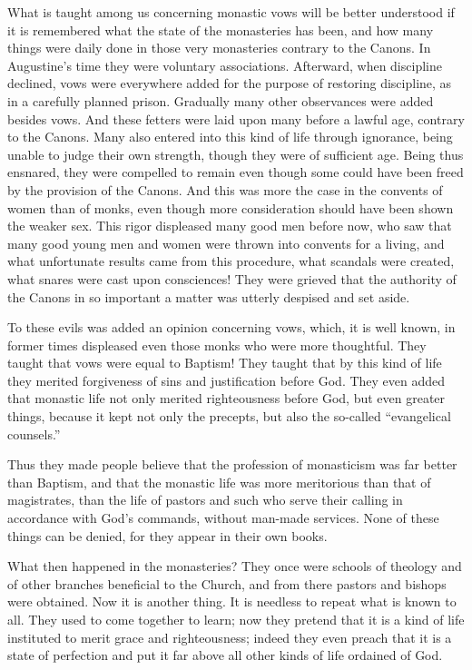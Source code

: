 What is taught among us concerning monastic vows will be better understood if it is remembered what the state of the monasteries has been, and how many things were daily done in those very monasteries contrary to the Canons. In Augustine’s time they were voluntary associations. Afterward, when discipline declined, vows were everywhere added for the purpose of restoring discipline, as in a carefully planned prison. Gradually many other observances were added besides vows. And these fetters were laid upon many before a lawful age, contrary to the Canons. Many also entered into this kind of life through ignorance, being unable to judge their own strength, though they were of sufficient age. Being thus ensnared, they were compelled to remain even though some could have been freed by the provision of the Canons. And this was more the case in the convents of women than of monks, even though more consideration should have been shown the weaker sex. This rigor displeased many good men before now, who saw that many good young men and women were thrown into convents for a living, and what unfortunate results came from this procedure, what scandals were created, what snares were cast upon consciences! They were grieved that the authority of the Canons in so important a matter was utterly despised and set aside.

To these evils was added an opinion concerning vows, which, it is well known, in former times displeased even those monks who were more thoughtful. They taught that vows were equal to Baptism! They taught that by this kind of life they merited forgiveness of sins and justification before God. They even added that monastic life not only merited righteousness before God, but even greater things, because it kept not only the precepts, but also the so-called “evangelical counsels.”

Thus they made people believe that the profession of monasticism was far better than Baptism, and that the monastic life was more meritorious than that of magistrates, than the life of pastors and such who serve their calling in accordance with God’s commands, without man-made services. None of these things can be denied, for they appear in their own books.

What then happened in the monasteries? They once were schools of theology and of other branches beneficial to the Church, and from there pastors and bishops were obtained. Now it is another thing. It is needless to repeat what is known to all. They used to come together to learn; now they pretend that it is a kind of life instituted to merit grace and righteousness; indeed they even preach that it is a state of perfection and put it far above all other kinds of life ordained of God.


